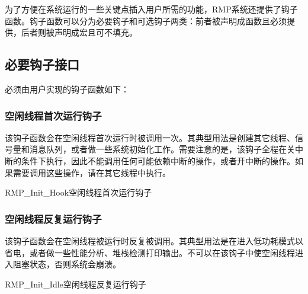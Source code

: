 为了方便在系统运行的一些关键点插入用户所需的功能，RMP系统还提供了钩子函数。钩子函数可以分为必要钩子和可选钩子两类：前者被声明成函数且必须提供，后者则被声明成宏且可不填充。

\subsection{必要钩子接口}\label{subsec:mandatory-hook-interface}

必须由用户实现的钩子函数如下：

\subsubsection{空闲线程首次运行钩子}\label{subsubsec:idle-thread-first-run-hook}

该钩子函数会在空闲线程首次运行时被调用一次。其典型用法是创建其它线程、信号量和消息队列，或者做一些系统初始化工作。需要注意的是，该钩子全程在关中断的条件下执行，因此不能调用任何可能依赖中断的操作，或者开中断的操作。如果需要调用这些操作，请在其它线程中执行。

\begin{apidesc}{RMP\_Init\_Hook}{空闲线程首次运行钩子}
    \begin{apiparams}
    \end{apiparams}
    \begin{apiret}
    \end{apiret}
\end{apidesc}

\subsubsection{空闲线程反复运行钩子}\label{subsubsec:idle-thread-repeated-run-hook}

该钩子函数会在空闲线程被运行时反复被调用。其典型用法是在进入低功耗模式以省电，或者做一些性能分析、堆栈检测打印输出。不可以在该钩子中使空闲线程进入阻塞状态，否则系统会崩溃。

\begin{apidesc}{RMP\_Init\_Idle}{空闲线程反复运行钩子}
    \begin{apiparams}
    \end{apiparams}
    \begin{apiret}
    \end{apiret}
\end{apidesc}

